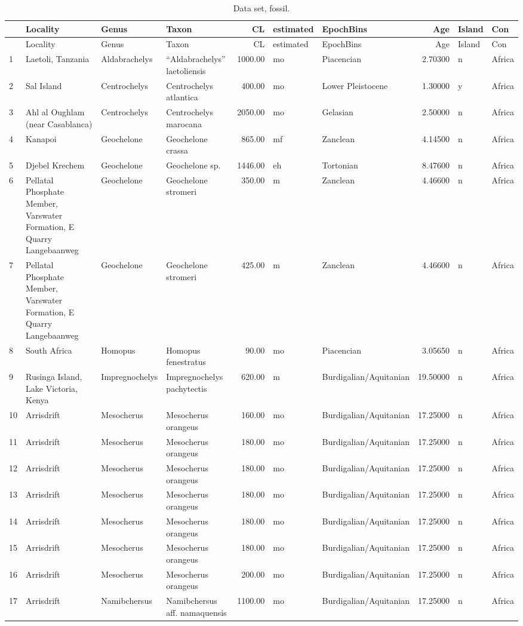 \documentclass[]{article}
\begin{document}
\begin{longtable}[]{@{}llllrllrll@{}}
\caption{Data set, fossil.}\tabularnewline
\toprule
& Locality & Genus & Taxon & CL & estimated & EpochBins & Age & Island &
Con\tabularnewline
\midrule
\endfirsthead
\toprule
& Locality & Genus & Taxon & CL & estimated & EpochBins & Age & Island &
Con\tabularnewline
\midrule
\endhead
1 & Laetoli, Tanzania & Aldabrachelys & ``Aldabrachelys'' laetoliensis &
1000.00 & mo & Piacencian & 2.70300 & n & Africa\tabularnewline
2 & Sal Island & Centrochelys & Centrochelys atlantica & 400.00 & mo &
Lower Pleistocene & 1.30000 & y & Africa\tabularnewline
3 & Ahl al Oughlam (near Casablanca) & Centrochelys & Centrochelys
marocana & 2050.00 & mo & Gelasian & 2.50000 & n & Africa\tabularnewline
4 & Kanapoi & Geochelone & Geochelone crassa & 865.00 & mf & Zanclean &
4.14500 & n & Africa\tabularnewline
5 & Djebel Krechem & Geochelone & Geochelone sp. & 1446.00 & eh &
Tortonian & 8.47600 & n & Africa\tabularnewline
6 & Pellatal Phosphate Member, Varswater Formation, E Quarry
Langebaanweg & Geochelone & Geochelone stromeri & 350.00 & m & Zanclean
& 4.46600 & n & Africa\tabularnewline
7 & Pellatal Phosphate Member, Varswater Formation, E Quarry
Langebaanweg & Geochelone & Geochelone stromeri & 425.00 & m & Zanclean
& 4.46600 & n & Africa\tabularnewline
8 & South Africa & Homopus & Homopus fenestratus & 90.00 & mo &
Piacencian & 3.05650 & n & Africa\tabularnewline
9 & Rusinga Island, Lake Victoria, Kenya & Impregnochelys &
Impregnochelys pachytectis & 620.00 & m & Burdigalian/Aquitanian &
19.50000 & n & Africa\tabularnewline
10 & Arrisdrift & Mesocherus & Mesocherus orangeus & 160.00 & mo &
Burdigalian/Aquitanian & 17.25000 & n & Africa\tabularnewline
11 & Arrisdrift & Mesocherus & Mesocherus orangeus & 180.00 & mo &
Burdigalian/Aquitanian & 17.25000 & n & Africa\tabularnewline
12 & Arrisdrift & Mesocherus & Mesocherus orangeus & 180.00 & mo &
Burdigalian/Aquitanian & 17.25000 & n & Africa\tabularnewline
13 & Arrisdrift & Mesocherus & Mesocherus orangeus & 180.00 & mo &
Burdigalian/Aquitanian & 17.25000 & n & Africa\tabularnewline
14 & Arrisdrift & Mesocherus & Mesocherus orangeus & 180.00 & mo &
Burdigalian/Aquitanian & 17.25000 & n & Africa\tabularnewline
15 & Arrisdrift & Mesocherus & Mesocherus orangeus & 180.00 & mo &
Burdigalian/Aquitanian & 17.25000 & n & Africa\tabularnewline
16 & Arrisdrift & Mesocherus & Mesocherus orangeus & 200.00 & mo &
Burdigalian/Aquitanian & 17.25000 & n & Africa\tabularnewline
17 & Arrisdrift & Namibchersus & Namibchersus aff. namaquensis & 1100.00
& mo & Burdigalian/Aquitanian & 17.25000 & n & Africa\tabularnewline

\end{longtable}
\end{document}
